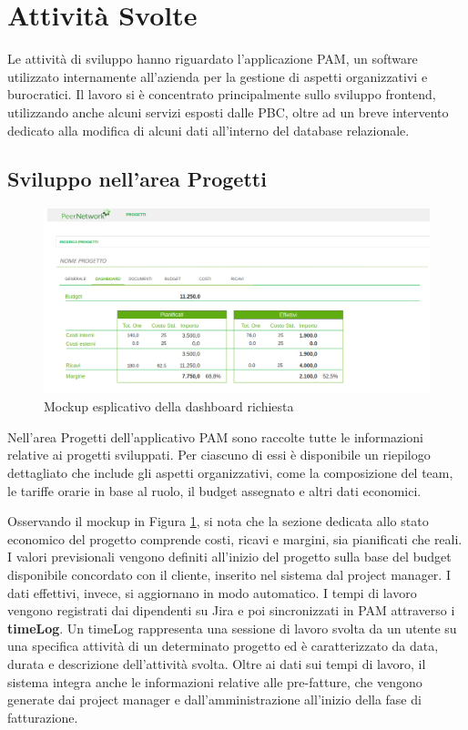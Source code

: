 \section{Attività Svolte}
Le attività di sviluppo hanno riguardato l’applicazione \ac{PAM}, un software utilizzato internamente all’azienda
per la gestione di aspetti organizzativi e burocratici. Il lavoro si è concentrato principalmente sullo
sviluppo frontend, utilizzando anche alcuni servizi esposti dalle \ac{PBC}, oltre ad un breve intervento
dedicato alla modifica di alcuni dati all'interno del database relazionale.

    \subsection{Sviluppo nell'area Progetti}
    \begin{figure}
        \centering
        \includegraphics[width=\linewidth]{figures/pam-dashboard.png}
        \caption{Mockup esplicativo della dashboard richiesta}
        \label{fig:mockup-pam}
    \end{figure}

    Nell’area Progetti dell’applicativo \ac{PAM} sono raccolte tutte le informazioni relative
    ai progetti sviluppati. Per ciascuno di essi è disponibile un riepilogo dettagliato che include gli aspetti
    organizzativi, come la composizione del team, le tariffe orarie in base al ruolo, il budget assegnato
    e altri dati economici.

    Osservando il mockup in Figura \ref{fig:mockup-pam}, si nota che la sezione dedicata allo stato economico
    del progetto comprende costi, ricavi e margini, sia pianificati che reali. I valori previsionali
    vengono definiti all’inizio del progetto sulla base del budget disponibile concordato
    con il cliente, inserito nel sistema dal project manager. I dati effettivi, invece, si aggiornano in modo automatico.
    I tempi di lavoro vengono registrati dai dipendenti su Jira e poi sincronizzati in \ac{PAM} attraverso i \textbf{timeLog}.
    Un timeLog rappresenta una sessione di lavoro svolta da un utente su una specifica attività di un determinato progetto ed è caratterizzato da
    data, durata e descrizione dell’attività svolta. Oltre ai dati sui tempi di lavoro, il sistema integra anche le
    informazioni relative alle pre-fatture, che vengono generate dai project manager e dall’amministrazione all’inizio
    della fase di fatturazione.
    
